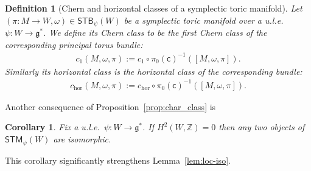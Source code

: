 \documentclass[10pt,a4paper]{amsart}
\numberwithin{equation}{section}
\newtheorem{Corollary}[Lemma]{Corollary}
\newtheorem{Definition}[Lemma]{Definition}
\begin{document}
\begin{Definition}[Chern and horizontal classes of a symplectic toric manifold]
  Let $(\pi\colon M\to W, \omega) \in {\textsf{STB}}_\psi(W)$ be a symplectic toric
  manifold over a u.l.e.\ $\psi\colon W\to {\mathfrak g}^*$. We def\/ine its {\em Chern
    class} to be the f\/irst Chern class of the corresponding principal
  torus bundle:
\begin{gather*}
c_1(M, \omega,\pi) := c_1 \circ  \pi_0({\textsf{c}})^{-1} ([M,\omega,\pi]).
\end{gather*}
Similarly its {\em horizontal class} is the horizontal class of the
corresponding bundle:
\begin{gather*}
c_{\text{hor}}(M, \omega,\pi) := c_{\text{hor}}\circ  \pi_0({\textsf{c}})^{-1} ([M,\omega,\pi]).
\end{gather*}
\end{Definition}
Another consequence of Proposition~\ref{prop:char_class} is
\begin{Corollary}\label{STB_is_a_gerbe}
  Fix a u.l.e.\ $\psi\colon W\to {\mathfrak g}^*$. If $H^2(W,{\mathbb Z})= 0$ then any two
  objects of ${\textsf{STM}}_\psi(W)$ are isomorphic.
\end{Corollary}
This corollary signif\/icantly strengthens Lemma~\ref{lem:loc-iso}.
\end{document}
